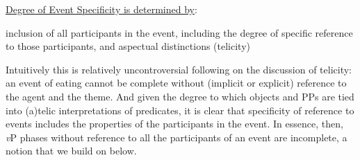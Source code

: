 \documentclass[output=paper
,modfonts
,nonflat
]{langsci/langscibook}
\begin{document}
\ea \underline{Degree of Event Specificity is determined by}:

\begin{xlist}
\ex inclusion of all participants in the event, including \label{IncludeParticipants}
\ex the degree of specific reference to those participants, and \label{}
\ex aspectual distinctions (telicity)
\end{xlist}

\z

Intuitively this is relatively uncontroversial following on the discussion of telicity: an event of eating cannot be complete without (implicit or explicit) reference to the agent and the theme. And given the degree to which objects and PPs are tied into (a)telic interpretations of predicates, it is clear that specificity of reference to events includes the properties of the participants in the event. In essence, then, \textit{v}P phases without reference to all the participants of an event are incomplete, a notion that we build on below.
\end{document}
